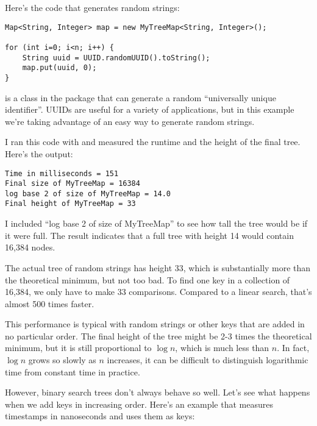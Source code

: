 \documentclass[12pt]{book}
\theoremstyle{exercise}
\begin{document}

Here's the code that generates random strings:

\begin{verbatim}
Map<String, Integer> map = new MyTreeMap<String, Integer>();

for (int i=0; i<n; i++) {
    String uuid = UUID.randomUUID().toString();
    map.put(uuid, 0);
}
\end{verbatim}

 is a class in the  package that can
generate a random ``universally unique identifier''. UUIDs are useful
for a variety of applications, but in this example we're taking
advantage of an easy way to generate random strings.


I ran this code with  and measured the runtime and the
height of the final tree. Here's the output:

\begin{verbatim}
Time in milliseconds = 151
Final size of MyTreeMap = 16384
log base 2 of size of MyTreeMap = 14.0
Final height of MyTreeMap = 33
\end{verbatim}

I included ``log base 2 of size of MyTreeMap'' to see how tall the tree
would be if it were full. The result indicates that a full tree with
height 14 would contain 16,384 nodes.

The actual tree of random strings has height 33, which is substantially
more than the theoretical minimum, but not too bad. To find one key in a
collection of 16,384, we only have to make 33 comparisons. Compared to a
linear search, that's almost 500 times faster.


This performance is typical with random strings or other keys that are
added in no particular order. The final height of the tree might be 2-3
times the theoretical minimum, but it is still proportional to
$\log n$, which is much less than $n$. In fact,
$\log n$ grows so slowly as $n$ increases, it can be
difficult to distinguish logarithmic time from constant time in
practice.


However, binary search trees don't always behave so well. Let's see what
happens when we add keys in increasing order. Here's an example that
measures timestamps in nanoseconds and uses them as keys:
\end{document}
